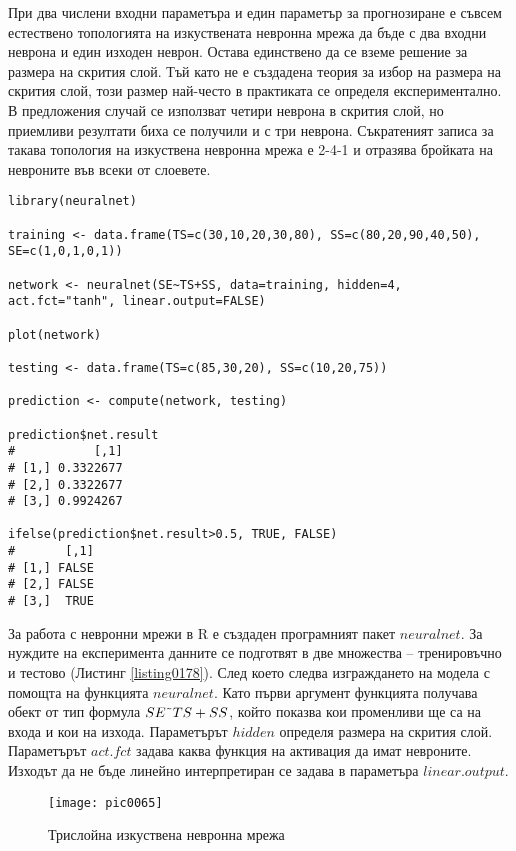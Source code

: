 При два числени входни параметъра и един параметър за прогнозиране е съвсем естествено топологията на изкуствената невронна мрежа да бъде с два входни неврона и един изходен неврон. Остава единствено да се вземе решение за размера на скрития слой. Тъй като не е създадена теория за избор на размера на скрития слой, този размер най-често в практиката се определя експериментално. В предложения случай се използват четири неврона в скрития слой, но приемливи резултати биха се получили и с три неврона. Съкратеният записа за такава топология на изкуствена невронна мрежа е 2-4-1 и отразява бройката на невроните във всеки от слоевете. 

\begin{lstlisting}[caption=Класифициране с изкуствена невронна мержа, label=listing0178]
library(neuralnet)

training <- data.frame(TS=c(30,10,20,30,80), SS=c(80,20,90,40,50), SE=c(1,0,1,0,1))

network <- neuralnet(SE~TS+SS, data=training, hidden=4, act.fct="tanh", linear.output=FALSE)

plot(network)

testing <- data.frame(TS=c(85,30,20), SS=c(10,20,75))

prediction <- compute(network, testing)

prediction$net.result
#           [,1]
# [1,] 0.3322677
# [2,] 0.3322677
# [3,] 0.9924267

ifelse(prediction$net.result>0.5, TRUE, FALSE)
#       [,1]
# [1,] FALSE
# [2,] FALSE
# [3,]  TRUE
\end{lstlisting}

За работа с невронни мрежи в R е създаден програмният пакет $neuralnet$. За нуждите на експеримента данните се подготвят в две множества – тренировъчно и тестово (Листинг \ref{listing0178}). След което следва изграждането на модела с помощта на функцията $neuralnet$. Като първи аргумент функцията получава обект от тип формула $SE\char`\~TS+SS$, който показва кои променливи ще са на входа и кои на изхода. Параметърът $hidden$ определя размера на скрития слой. Параметърът $act.fct$ задава каква функция на активация да имат невроните. Изходът да не бъде линейно интерпретиран се задава в параметъра $linear.output$.

\begin{figure}[h!]
  \centering
  \texttt{[image: pic0065]}
  \caption{Трислойна изкуствена невронна мрежа}
\label{figure0065}
\end{figure}
\FloatBarrier

